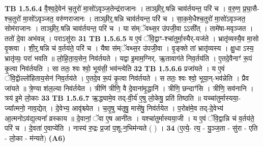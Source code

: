 \documentclass[17pt]{extarticle}
\begin{document}
                  \newline
                                \textbf{ TB 1.5.6.4} \newline
                  वै॒श्व॒दे॒वेन॑ च॒तुरो॑ मा॒सो॑ऽवृञ्ज॒तेन्द्र॑राजानः । ताञ्छी॒र्॒.षन्नि चाव॑र्तयन्त॒ परि॑ च । व॒रु॒ण॒ प्र॒घा॒सै-श्च॒तुरो॑ मा॒सो॑ऽवृञ्जत॒ वरु॑णराजानः । ताञ्छी॒र्॒.षन्नि चाव॑र्तयन्त॒ परि॑ च । सा॒क॒मे॒धैश्च॒तुरो॑ मा॒सो॑ऽवृञ्जत॒ सोम॑राजानः । ताञ्छी॒र॒.षन्नि चाव॑र्तयन्त॒ परि॑ च । या स॑म्ॅवथ्स॒र उ॑पजी॒वा ऽऽसी᳚त् । तामे॑षा-मवृञ्जत । ततो॑ दे॒वा अभ॑वन्न् । पराऽसु॑राः \textbf{ 31} \newline
                  \newline
                                \textbf{ TB 1.5.6.5} \newline
                  य ए॒वं ॅवि॒द्वाꣳ-श्चा॑तुर्मा॒स्यैर्-यज॑ते । भ्रातृ॑व्यस्यै॒व मा॒सो वृ॒क्त्वा । शी॒र्॒.षन्नि च॑ व॒र्तय॑ते॒ परि॑ च । यैषा स॑म्ॅवथ्स॒र उ॑पजी॒वा । वृ॒ङ्क्ते तां भ्रातृ॑व्यस्य । क्षु॒धा ऽस्य॒ भ्रातृ॑व्यः॒ परा॑ भवति ॥ लो॒हि॒ता॒य॒सेन॒ निव॑र्तयते । यद्वा इ॒माम॒ग्निर्. ऋ॒तावाग॑ते निव॒र्तय॑ति । ए॒तदे॒वैनाꣳ॑ रू॒पं कृ॒त्वा निव॑र्तयति । सा ततः॒ श्वः श्वो॒ भूय॑सी॒ भव॑न्त्येति \textbf{ 32} \newline
                  \newline
                                \textbf{ TB 1.5.6.6} \newline
                  प्रजा॑यते । य ए॒वं ॅवि॒द्वाॅल्लो॑हिताय॒सेन॑ निव॒र्तय॑ते । ए॒तदे॒व रू॒पं कृ॒त्वा निव॑र्तयते । स ततः॒ श्वः श्वो॒ भूया॒न्-भव॑न्नेति । प्रैव जा॑यते ॥ त्रे॒ण्या श॑ल॒ल्या निव॑र्तयेत । त्रीणि॑ त्रीणि॒ वै दे॒वाना॑मृ॒द्धानि॑ । त्रीणि॒ छन्दाꣳ॑सि । त्रीणि॒ सव॑नानि । त्रय॑ इ॒मे लो॒काः \textbf{ 33} \newline
                  \newline
                                \textbf{ TB 1.5.6.7} \newline
                  ऋ॒द्ध्यामे॒व तद्-वी॒र्य॑ ए॒षु लो॒केषु॒ प्रति॑ तिष्ठति ॥ यच्चा॑तुर्मास्यया॒-ज्या᳚त्मनो॒ नाव॒द्येत् । दे॒वेभ्य॒ आवृ॑श्च्येत । च॒तृ॒षु च॑तृषु॒ मासे॑षु॒ निव॑र्तयेत । प॒रोक्ष॑मे॒व तद्-दे॒वेभ्य॑ आ॒त्मनोऽव॑द्य॒त्यना᳚ व्रस्काय ॥  दे॒वानां॒ ॅवा ए॒ष आनी॑तः । यश्चा॑तुर्मास्यया॒जी । य ए॒वं ॅवि॒द्वान्नि च॑ व॒र्तय॑ते॒ परि॑ च । दे॒वता॑ ए॒वाप्ये॑ति । नास्य॑ रु॒द्रः प्र॒जां प॒शू-न॒भिम॑न्यते ( ) । \textbf{ 34} \newline
                  \newline
                                    (ए॒त्ये॒- त्य॒ - यु॒ञ्ज॒ता - सु॑रा - एति - लो॒का - म॑न्यते) \textbf{(A6)} \newline \newline
\end{document}
